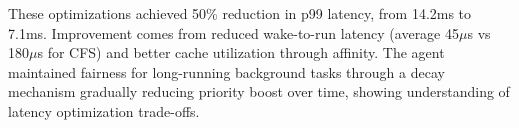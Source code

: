 These optimizations achieved 50\% reduction in p99 latency, from 14.2ms to 7.1ms. Improvement comes from reduced wake-to-run latency (average 45$\mu$s vs 180$\mu$s for CFS) and better cache utilization through affinity. The agent maintained fairness for long-running background tasks through a decay mechanism gradually reducing priority boost over time, showing understanding of latency optimization trade-offs.

